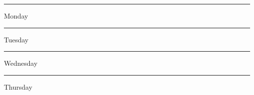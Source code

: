 \documentclass[12pt,letterpaper]{memoir}
\begin{document}
\pagestyle{empty}
\checkandfixthelayout
\raggedbottom

 \hrule
{
    \noindent Monday
}

\vfil 

\hrule
{

    \noindent Tuesday
}

\newpage

{
    \hrule
    Wednesday
}

\vfil 

{
    \hrule
    Thursday
}
\end{document}
